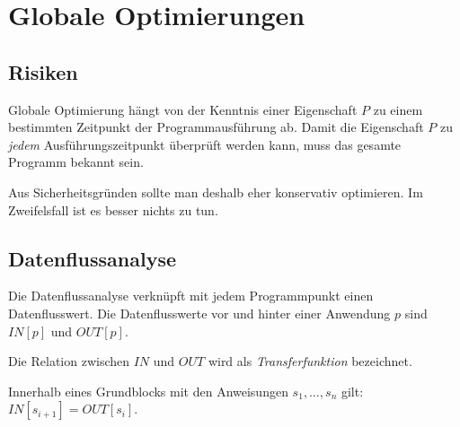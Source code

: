 \section{Globale Optimierungen}

\subsection{Risiken}

Globale Optimierung hängt von der Kenntnis einer Eigenschaft $P$ zu einem
bestimmten Zeitpunkt der Programmausführung ab. Damit die Eigenschaft $P$ zu
\textit{jedem} Ausführungszeitpunkt überprüft werden kann, muss das gesamte
Programm bekannt sein.

Aus Sicherheitsgründen sollte man deshalb eher konservativ optimieren. Im
Zweifelsfall ist es besser nichts zu tun.

\subsection{Datenflussanalyse}

Die Datenflussanalyse verknüpft mit jedem Programmpunkt einen Datenflusswert.
Die Datenflusswerte vor und hinter einer Anwendung $p$ sind $IN[p]$ und
$OUT[p]$.

Die Relation zwischen $IN$ und $OUT$ wird als \textit{Transferfunktion}
bezeichnet.

Innerhalb eines Grundblocks mit den Anweisungen $s_1,\ldots,s_n$ gilt:
$IN[s_{i+1}] = OUT[s_i]$.
